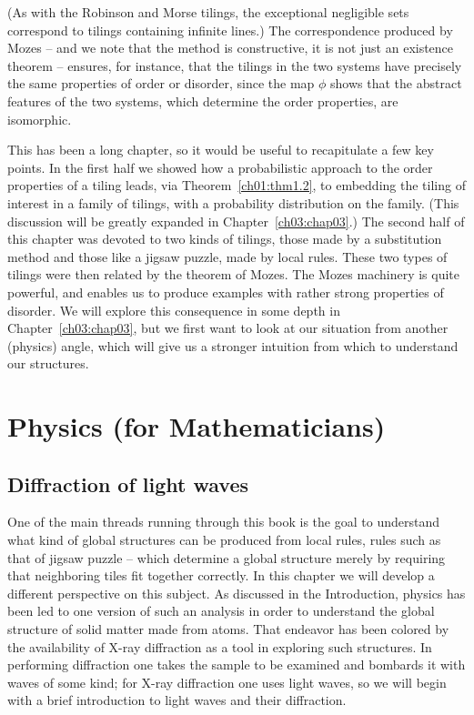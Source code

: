 \documentclass[reqno]{stml-l}
\theoremstyle{plain}
\theoremstyle{definition}
\numberwithin{equation}{chapter}
\begin{document}
(As with the Robinson and Morse tilings, the exceptional negligible sets correspond to tilings containing infinite lines.) The correspondence produced by Mozes -- and we note that the method is constructive, it is not just an existence theorem -- ensures, for instance, that the tilings in the two systems have precisely the same properties of order or disorder, since the map $\phi$ shows that the abstract features of the two systems, which determine the order properties, are isomorphic.

This has been a long chapter, so it would be useful to recapitulate a few key points. In the first half we showed how a probabilistic approach to the order properties of a tiling leads, via Theorem~\ref{ch01:thm1.2}, to embedding the tiling of interest in a family of tilings, with a probability distribution on the family. (This discussion will be greatly
expanded in Chapter~\ref{ch03:chap03}.) The second half of this chapter was devoted to two kinds of tilings, those made by a substitution method and those like a jigsaw puzzle, made by local rules. These two types of tilings were then related by the theorem of Mozes. The Mozes machinery is quite powerful, and enables us to produce examples with rather strong properties of disorder. We will explore this consequence in some depth in Chapter~\ref{ch03:chap03}, but we first want to look at our situation from another (physics) angle, which will give us a stronger intuition from which to understand our structures.

\chapter{Physics (for Mathematicians)\label{ch02:chap02}}

\section{Diffraction of light waves}\label{ch02:sec1}

One of the main threads running through this book is the goal to understand what kind of global structures can be produced from local rules, rules such as that of jigsaw puzzle -- which determine a global structure merely by requiring that neighboring tiles fit together correctly. In this chapter we will develop a different perspective on this subject. As discussed in the Introduction, physics has been led to one version of such an analysis in order to understand the global structure of solid matter made from atoms. That endeavor has been colored by the availability of X-ray diffraction as a tool in exploring such structures. In performing diffraction one takes the sample to be examined and bombards it with waves of some kind; for X-ray diffraction one uses light waves, so we will begin with a brief introduction to light waves and their diffraction.
\end{document}
